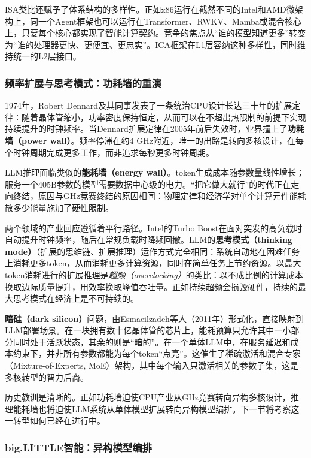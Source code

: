 ISA类比还赋予了体系结构的多样性。正如x86运行在截然不同的Intel和AMD微架构上，同一个Agent框架也可以运行在Transformer、RWKV、Mamba或混合核心上，只要每个核心都实现了智能计算契约\cite{hennessy_patterson_2019}。竞争的焦点从``谁的模型知道更多''转变为``谁的处理器更快、更便宜、更忠实''。ICA框架在L1层容纳这种多样性，同时维持统一的L2层接口。

\subsubsection{频率扩展与思考模式：功耗墙的重演}

1974年，Robert Dennard及其同事发表了一条统治CPU设计长达三十年的扩展定律：随着晶体管缩小，功率密度保持恒定，从而可以在不超出热限制的前提下实现持续提升的时钟频率\cite{dennard_1974}。当Dennard扩展定律在2005年前后失效时，业界撞上了\textbf{功耗墙（power wall）}。频率停滞在约4 GHz附近，唯一的出路是转向多核设计，在每个时钟周期完成更多工作，而非追求每秒更多时钟周期\cite{esmaeilzadeh_2011}。

LLM推理面临类似的\textbf{能耗墙（energy wall）}。token生成成本随参数量线性增长；服务一个405B参数的模型需要数据中心级的电力。``把它做大就行''的时代正在走向终结，原因与GHz竞赛终结的原因相同：物理定律和经济学对单个计算元件能耗散多少能量施加了硬性限制。

两个领域的产业回应遵循着平行路径。Intel的Turbo Boost在面对突发的高负载时自动提升时钟频率，随后在常规负载时降频回撤。LLM的\textbf{思考模式（thinking mode）}（扩展的思维链、扩展推理）运作方式完全相同：系统自动地在困难任务上消耗更多token，从而消耗更多计算资源，同时在简单任务上节约资源。以最大token消耗进行的扩展推理是\textit{超频（overclocking）}的类比：以不成比例的计算成本换取边际质量提升，用效率换取峰值吞吐量。正如持续超频会损毁硬件，持续的最大思考模式在经济上是不可持续的。

\textbf{暗硅（dark silicon）}问题，由Esmaeilzadeh等人（2011年）形式化，直接映射到LLM部署场景。在一块拥有数十亿晶体管的芯片上，能耗预算只允许其中一小部分同时处于活跃状态，其余的则是``暗的''。在一个单体LLM中，在服务延迟和成本约束下，并非所有参数都能为每个token``点亮''。这催生了稀疏激活和混合专家（Mixture-of-Experts, MoE）架构，其中每个输入只激活相关的参数子集，这是多核转型的智力后裔\cite{moore_1965, amdahl_1967}。

历史教训是清晰的。正如功耗墙迫使CPU产业从GHz竞赛转向异构多核设计，推理能耗墙也将迫使LLM系统从单体模型扩展转向异构模型编排。下一节将考察这一转型如何已经在进行中。

\subsubsection{big.LITTLE智能：异构模型编排}

